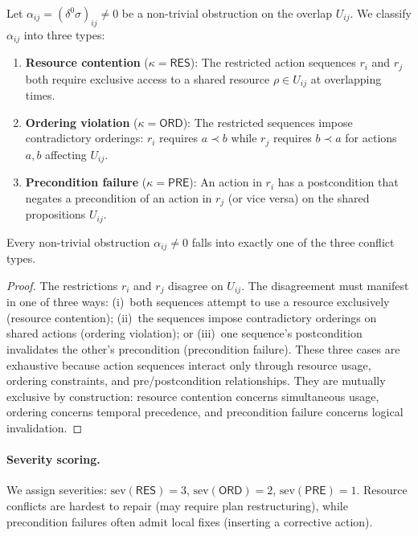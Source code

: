 \documentclass[11pt]{article}
\newcommand{\SubGoal}[1]{U_{#1}}
\newcommand{\Severity}{\mathrm{sev}}
\begin{document}
\begin{definition}\label{def:conflict-types}
  Let $\alpha_{ij} = (\delta^0 \sigma)_{ij} \neq 0$ be a
  non-trivial obstruction on the overlap $\SubGoal{ij}$.  We
  classify $\alpha_{ij}$ into three types:
  \begin{enumerate}[leftmargin=*,itemsep=2pt]
    \item \textbf{Resource contention} ($\kappa = \mathsf{RES}$):
      The restricted action sequences $r_i$ and $r_j$ both
      require exclusive access to a shared resource
      $\rho \in \SubGoal{ij}$ at overlapping times.
    \item \textbf{Ordering violation} ($\kappa = \mathsf{ORD}$):
      The restricted sequences impose contradictory orderings:
      $r_i$ requires $a \prec b$ while $r_j$ requires $b \prec a$
      for actions $a, b$ affecting $\SubGoal{ij}$.
    \item \textbf{Precondition failure} ($\kappa = \mathsf{PRE}$):
      An action in $r_i$ has a postcondition that negates a
      precondition of an action in $r_j$ (or vice versa) on
      the shared propositions $\SubGoal{ij}$.
  \end{enumerate}
\end{definition}

\begin{lemma}\label{lem:classify-complete}
  Every non-trivial obstruction $\alpha_{ij} \neq 0$ falls into
  exactly one of the three conflict types.
\end{lemma}

\begin{proof}
  The restrictions $r_i$ and $r_j$ disagree on $\SubGoal{ij}$.
  The disagreement must manifest in one of three ways:
  (i)~both sequences attempt to use a resource exclusively
  (resource contention); (ii)~the sequences impose contradictory
  orderings on shared actions (ordering violation); or (iii)~one
  sequence's postcondition invalidates the other's precondition
  (precondition failure).  These three cases are exhaustive because
  action sequences interact only through resource usage, ordering
  constraints, and pre/postcondition relationships.  They are
  mutually exclusive by construction: resource contention concerns
  simultaneous usage, ordering concerns temporal precedence, and
  precondition failure concerns logical invalidation.
\end{proof}

\paragraph{Severity scoring.}
We assign severities: $\Severity(\mathsf{RES}) = 3$,
$\Severity(\mathsf{ORD}) = 2$, $\Severity(\mathsf{PRE}) = 1$.
Resource conflicts are hardest to repair (may require plan
restructuring), while precondition failures often admit local
fixes (inserting a corrective action).
\end{document}
